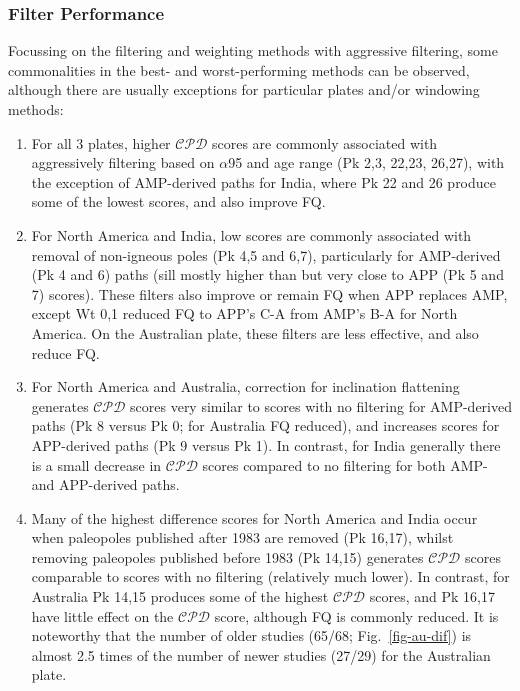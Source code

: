 \subsubsection{Filter Performance}

Focussing on the filtering and weighting methods with aggressive filtering,
some commonalities in the best- and worst-performing methods can be observed,
although there are usually exceptions for particular plates and/or windowing
methods:
%
\begin{enumerate}
  \item For all 3 plates, higher $\mathcal{CPD}$ scores are commonly associated
  with aggressively filtering based on $\alpha$95 and age range (Pk 2,3, 22,23,
  26,27), with the exception of AMP-derived paths for India, where Pk 22 and 26
  produce some of the lowest scores, and also improve FQ\@.
  \item For North America and India, low scores are commonly associated with
  removal of non-igneous poles (Pk 4,5 and 6,7), particularly for AMP-derived
  (Pk 4 and 6) paths (sill mostly higher than but very close to APP (Pk 5 and
  7) scores). These filters also improve or remain FQ when APP replaces AMP,
  except Wt 0,1 reduced FQ to APP's C-A from AMP's B-A for North America. On the
  Australian plate, these filters are less effective, and also reduce FQ\@.
  \item For North America and Australia, correction for inclination flattening
  generates $\mathcal{CPD}$ scores very similar to scores with no filtering  for
  AMP-derived paths (Pk 8 versus Pk 0; for Australia FQ reduced), and increases
  scores for APP-derived paths (Pk 9 versus Pk 1). In contrast, for India
  generally there is a small decrease in $\mathcal{CPD}$ scores compared to no
  filtering for both AMP- and APP-derived paths.
  \item Many of the highest difference scores for North America and India occur
  when paleopoles published after 1983 are removed (Pk 16,17), whilst removing
  paleopoles published before 1983 (Pk 14,15) generates $\mathcal{CPD}$ scores
  comparable to scores with no filtering (relatively much lower). In contrast,
  for Australia Pk 14,15 produces some of the highest $\mathcal{CPD}$ scores,
  and Pk 16,17 have little effect on the $\mathcal{CPD}$ score, although FQ is
  commonly reduced. It is noteworthy that the number of older studies (65/68;
  Fig.~\ref{fig-au-dif}) is almost 2.5 times of the number of newer studies
  (27/29) for the Australian plate.
\end{enumerate}

